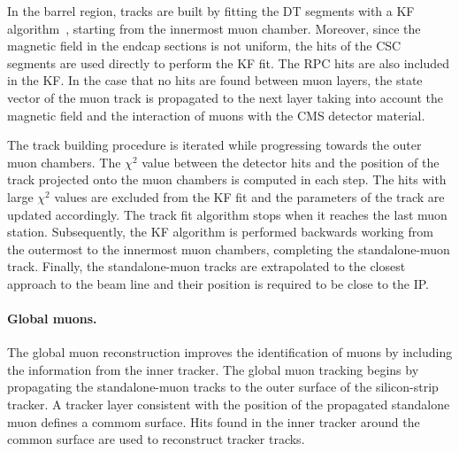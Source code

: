 In the barrel region, tracks are built by fitting the DT segments with a KF algorithm~\cite{KalmanFilter}, starting from the innermost muon chamber. Moreover, since the magnetic field in the endcap sections is not uniform, the hits of the CSC segments are used directly to perform the KF fit. The RPC hits are also included in the KF. In the case that no hits are found between muon layers, the state vector of the muon track is propagated to the next layer taking into account the magnetic field and the interaction of muons with the CMS detector material.

The track building procedure is iterated while progressing towards the outer muon chambers. The $\chi^{2}$ value between the detector hits and the position of the track projected onto the muon chambers is computed in each step. The hits with large $\chi^{2}$ values are excluded from the KF fit and the parameters of the track are updated accordingly. The track fit algorithm stops when it reaches the last muon station. Subsequently, the KF algorithm is performed backwards working from the outermost to the innermost muon chambers, completing the standalone-muon track. Finally, the standalone-muon tracks are extrapolated to the closest approach to the beam line and their position is required to be close to the IP.

\paragraph{Global muons.} The global muon reconstruction improves the identification of muons by including the information from the inner tracker. The global muon tracking begins by propagating the standalone-muon tracks to the outer surface of the silicon-strip tracker. A tracker layer consistent with the position of the propagated standalone muon defines a commom surface. Hits found in the inner tracker around the common surface are used to reconstruct tracker tracks.

